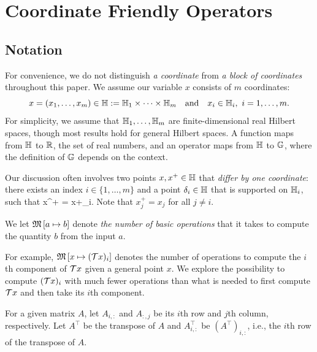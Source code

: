 \section{Coordinate Friendly Operators}\label{sec:cuf}

\subsection{Notation}
For convenience, we do not distinguish \emph{a coordinate} from \emph{a block of coordinates} throughout this paper. We assume our variable $x$ consists of $m$ coordinates: $$x = (x_1, \ldots, x_m) \in\mathbb{H} := \mathbb{H}_1 \times \cdots \times \mathbb{H}_m\quad\mbox{and}\quad x_i\in\mathbb{H}_i,~ i=1,\ldots,m.$$ For simplicity, we assume that $\mathbb{H}_1,\ldots,\mathbb{H}_m$ are finite-dimensional real Hilbert spaces, though most results hold for general Hilbert spaces.
A function maps from $\mathbb{H}$ to $\mathbb{R}$, the set of real numbers, and an operator maps from $\mathbb{H}$ to $\mathbb{G}$, where the definition of $\mathbb{G}$ depends on the context. 

Our discussion often involves two points $x,x^+\in\mathbb{H}$ that \emph{differ by one coordinate}: there exists an index $i\in\{1,\ldots,m\}$ and a point $\delta_i\in\mathbb{H}$ that is supported on $\mathbb{H}_i$, such that
\beq\label{singleupdate}
x^+ = x+\delta_i.
\eeq
Note that $x^+_j=x_j$ for all $j\not=i$. 
\begin{definition}
We let $\mathfrak{M}\left[{a}\mapsto {b}\right]$ denote \emph{the number of basic operations} that it takes to compute the quantity $b$ from the  input $a$.
\end{definition}
For example, $\mathfrak{M}\left[{x}\mapsto {({\mathcal{T}}x)_i}\right]$ denotes the number of operations to compute the $i$th component of ${\mathcal{T}} x$ given a general point $x$. We explore the possibility to compute  $({\mathcal{T}} x)_i$ with much fewer operations than what is needed to first compute ${\mathcal{T}} x$ and  then take its $i$th component. %

For a given matrix $A$, let $A_{i,:}$ and $A_{:,j}$ be its $i$th row and $j$th column, respectively. Let $A^\top$ be the transpose of $A$ and $A^\top_{i,:}$ be $(A^\top)_{i,:}$, i.e., the $i$th row of the transpose of $A$. 

